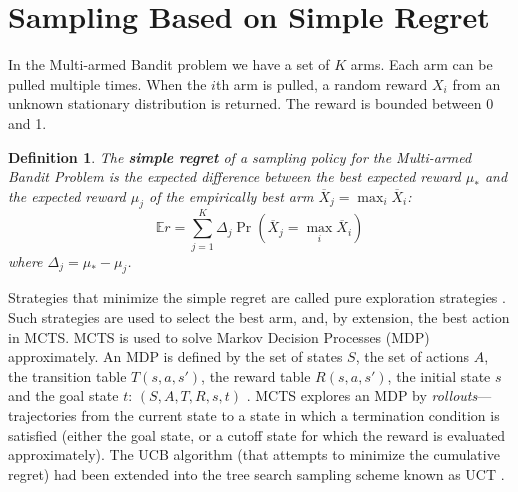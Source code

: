 \documentclass[letterpaper]{article}
\newcommand {\IE} {\ensuremath {\mathbb{E}}}
\newtheorem{dfn}{Definition}
\begin{document}
\section{Sampling Based on Simple Regret}
\label{sec:results}

In the Multi-armed Bandit problem \cite{Vermorel.bandits} we have a set
of $K$ arms. Each arm can be pulled multiple times. When the $i$th arm
is pulled, a random reward $X_i$ from an unknown stationary
distribution is returned.  The reward is bounded between 0 and 1.

\begin{dfn}
The \textbf{simple regret} of a sampling policy for the Multi-armed Bandit
Problem is the expected difference between the best expected reward
$\mu_*$ and the expected reward $\mu_j$ of the empirically best arm
$\overline X_j=\max_i\overline X_i$:
\begin{equation}
\label{eq:simple-regret}
\IE r=\sum_{j=1}^K\Delta_j\Pr(\overline X_j=\max_i\overline X_i)
\end{equation}
where $\Delta_j=\mu_*-\mu_j$.
\end{dfn}

Strategies that minimize the simple regret are called pure exploration
strategies \cite{Bubeck.pure}. Such strategies are used to select the
best arm, and, by extension, the best action in MCTS. MCTS is used to
solve Markov Decision Processes (MDP) approximately. An MDP is defined
by the set of states $S$, the set of actions $A$, the transition table
$T(s, a, s')$, the reward table $R(s, a, s')$, the initial state $s$
and the goal state $t$: $(S, A, T, R, s, t)$ \cite{Russell.aima}.
MCTS explores an MDP by \emph{rollouts}---trajectories from the
current state to a state in which a termination condition is satisfied
(either the goal state, or a cutoff state for which the reward is
evaluated approximately). The UCB algorithm (that attempts to minimize
the cumulative regret) \cite{Auer.ucb} had been extended into the tree
search sampling scheme known as UCT \cite{Kocsis.uct}.
\end{document}

